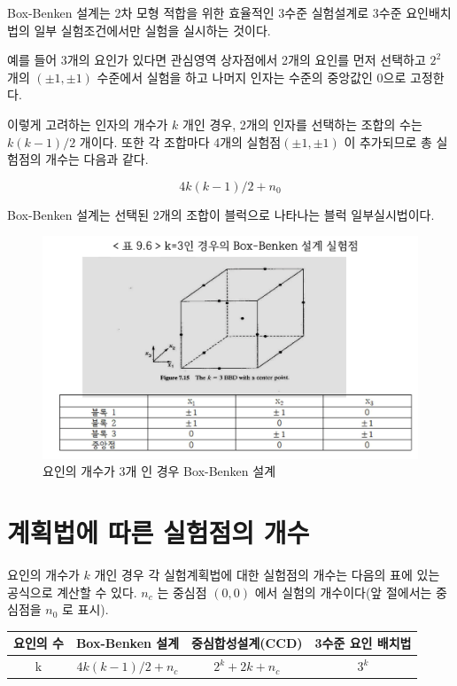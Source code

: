 \documentclass[
]{book}
\theoremstyle{definition}
\theoremstyle{definition}
\theoremstyle{definition}
\theoremstyle{definition}
\theoremstyle{remark}
\begin{document}
Box-Benken 설계는 2차 모형 적합을 위한 효율적인 3수준 실험설계로 3수준 요인배치법의 일부 실험조건에서만 실험을 실시하는 것이다.

예를 들어 3개의 요인가 있다면 관심영역 상자점에서 2개의 요인를 먼저 선택하고 \(2^2\) 개의 \((\pm 1, \pm1)\) 수준에서 실험을 하고 나머지 인자는 수준의 중앙값인 0으로 고정한다.

이렇게 고려하는 인자의 개수가 \(k\) 개인 경우, 2개의 인자를 선택하는 조합의 수는 \(k(k-1)/2\) 개이다. 또한 각 조합마다 4개의 실험점\((\pm 1, \pm1)\) 이 추가되므로 총 실험점의 개수는 다음과 같다.

\[ 4k(k-1)/2 + n_0 \]

Box-Benken 설계는 선택된 2개의 조합이 블럭으로 나타나는 블럭 일부실시법이다.

\begin{figure}

{\centering \includegraphics[width=0.8\linewidth]{myimages/boxbenken} 

}

\caption{요인의 개수가 3개 인 경우 Box-Benken 설계}\label{fig:unnamed-chunk-28}
\end{figure}

\hypertarget{uxacc4uxd68duxbc95uxc5d0-uxb530uxb978-uxc2e4uxd5d8uxc810uxc758-uxac1cuxc218}{%
\section{계획법에 따른 실험점의 개수}\label{uxacc4uxd68duxbc95uxc5d0-uxb530uxb978-uxc2e4uxd5d8uxc810uxc758-uxac1cuxc218}}

요인의 개수가 \(k\) 개인 경우 각 실험계획법에 대한 실험점의 개수는 다음의 표에 있는 공식으로 계산할 수 있다. \(n_c\) 는 중심점 \((0,0)\) 에서 실험의 개수이다(앞 절에서는 중심점을 \(n_0\) 로 표시).

\begin{longtable}[]{@{}cccc@{}}
\toprule
요인의 수 & Box-Benken 설계 & 중심합성설계(CCD) & 3수준 요인 배치법\tabularnewline
\midrule
\endhead
k & \(4k(k-1)/2 + n_c\) & \(2^k+2k + n_c\) & \(3^k\)\tabularnewline
\bottomrule
\end{longtable}
\end{document}
